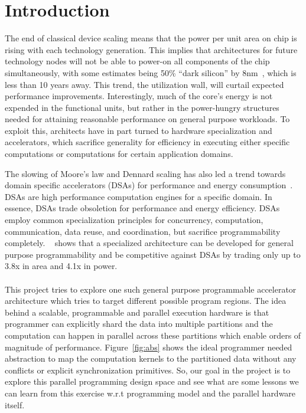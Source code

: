 \section{Introduction}

The end of classical device scaling means that the power per unit area on chip
is rising with each technology generation.  This implies that architectures for
future technology nodes will not be able to power-on all components of the chip
simultaneously, with some estimates being 50\% ``dark silicon'' by
8nm~\cite{isca11:dark-silicon}, which is less than 10 years away.  This trend,
the utilization wall, will curtail expected performance improvements.
Interestingly, much of the core's energy is not expended in the functional
units, but rather in the power-hungry structures needed for
attaining reasonable performance on general purpose workloads.  To exploit this,
architects have in part turned to hardware specialization and
accelerators, which sacrifice generality for efficiency in executing either
specific computations or computations for certain application domains.

The slowing of Moore’s law and Dennard scaling has also led a trend towards 
domain specific accelerators (DSAs) for performance and energy consumption~\cite{1815968}. 
DSAs are high performance computation engines for a specific domain. 
In essence, DSAs trade obsoletion for performance and energy efficiency. 
DSAs employ common specialization principles for concurrency, computation, 
communication, data reuse, and coordination, 
but sacrifice programmability completely. 
~\cite{nowatzki2016pushing} shows that a specialized architecture can be developed for 
general purpose programmability and be competitive 
against DSAs by trading only up to 3.8x in area and 4.1x in power. 

\paragraph{}This project tries to explore one such general purpose programmable
accelerator architecture which tries to target different possible program regions.
The idea behind a scalable, programmable and parallel execution hardware is that programmer
can explicitly shard the data into multiple partitions and the computation can happen in parallel 
across these partitions which enable orders of magnitude of performance. Figure~\ref{fig:abs}
shows the ideal programmer needed abstraction to map the computation kernels to the partitioned data
without any conflicts or explicit synchronization primitives. So, our goal in the project is to explore this
parallel programming design space and see what are some lessons we can learn from this exercise w.r.t programming model
and the parallel hardware itself.


